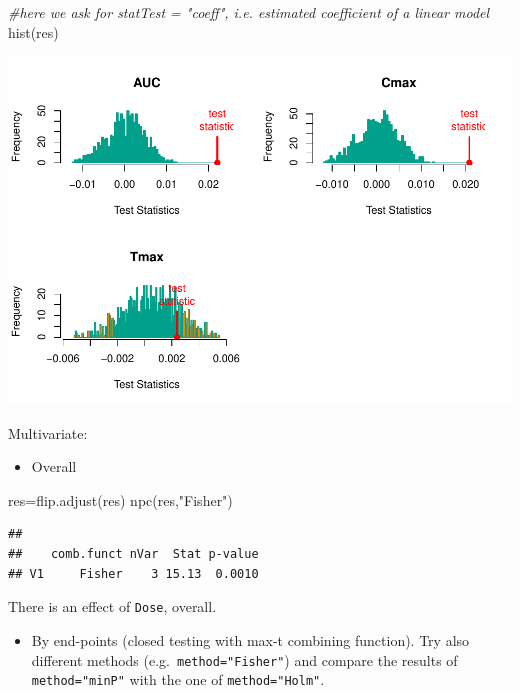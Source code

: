 \documentclass[
]{article}
\newenvironment{Shaded}{\begin{snugshade}}{\end{snugshade}}
\newcommand{\CommentTok}[1]{\textcolor[rgb]{0.56,0.35,0.01}{\textit{#1}}}
\newcommand{\FunctionTok}[1]{\textcolor[rgb]{0.00,0.00,0.00}{#1}}
\newcommand{\NormalTok}[1]{#1}
\newcommand{\OtherTok}[1]{\textcolor[rgb]{0.56,0.35,0.01}{#1}}
\newcommand{\StringTok}[1]{\textcolor[rgb]{0.31,0.60,0.02}{#1}}
\providecommand{\tightlist}{%
  \setlength{\itemsep}{0pt}\setlength{\parskip}{0pt}}
\begin{document}
\begin{Shaded}
\begin{Highlighting}[]
\CommentTok{\#here we ask for statTest = "coeff", i.e. estimated coefficient of a linear model}
\FunctionTok{hist}\NormalTok{(res)}
\end{Highlighting}
\end{Shaded}

\begin{center}\includegraphics{perm_files/figure-latex/unnamed-chunk-42-1} \end{center}

Multivariate:

\begin{itemize}
\tightlist
\item
  Overall
\end{itemize}

\begin{Shaded}
\begin{Highlighting}[]
\NormalTok{res}\OtherTok{=}\FunctionTok{flip.adjust}\NormalTok{(res)}
\FunctionTok{npc}\NormalTok{(res,}\StringTok{"Fisher"}\NormalTok{)}
\end{Highlighting}
\end{Shaded}

\begin{verbatim}
## 
##    comb.funct nVar  Stat p-value
## V1     Fisher    3 15.13  0.0010
\end{verbatim}

There is an effect of \texttt{Dose}, overall.

\begin{itemize}
\tightlist
\item
  By end-points (closed testing with max-t combining function). Try also
  different methods (e.g.~\texttt{method="Fisher"}) and compare the
  results of \texttt{method="minP"} with the one of
  \texttt{method="Holm"}.
\end{itemize}
\end{document}
